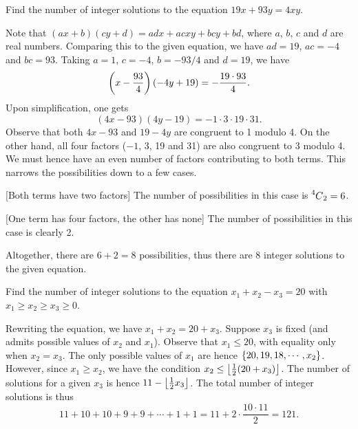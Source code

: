 \begin{question}[8]\label{Q::2022-O-1-17}
    Find the number of integer solutions to the equation $19x + 93y = 4xy$.
\end{question}
\begin{solution*}
    Note that $(ax+b)(cy+d) = adx + acxy + bcy + bd$, where $a$, $b$, $c$ and $d$ are real numbers. Comparing this to the given equation, we have $ad = 19$, $ac = -4$ and $bc = 93$. Taking $a = 1$, $c = -4$, $b = -93/4$ and $d = 19$, we have \[\left( x - \frac{93}{4} \right)(-4y + 19) = -\dfrac{19 \cdot 93}{4}.\] Upon simplification, one gets \[(4x - 93)(4y-19) = -1 \cdot 3 \cdot 19 \cdot 31.\] Observe that both $4x - 93$ and $19 - 4y$ are congruent to 1 modulo 4. On the other hand, all four factors ($-1$, 3, 19 and 31) are also congruent to 3 modulo 4. We must hence have an even number of factors contributing to both terms. This narrows the possibilities down to a few cases.

    [Both terms have two factors] The number of possibilities in this case is $\prescript{4\mkern-0.5mu}{}C_{2} = 6$.

    [One term has four factors, the other has none] The number of possibilities in this case is clearly 2.

    Altogether, there are $6 + 2 = 8$ possibilities, thus there are 8 integer solutions to the given equation.
\end{solution*}

\begin{question}[121]\label{Q::2022-O-1-18}
    Find the number of integer solutions to the equation $x_1 + x_2 - x_3 = 20$ with $x_1 \geq x_2 \geq x_3 \geq 0$.
\end{question}
\begin{solution*}
    Rewriting the equation, we have $x_1 + x_2 = 20 + x_3$. Suppose $x_3$ is fixed (and admits possible values of $x_2$ and $x_1$). Observe that $x_1 \leq 20$, with equality only when $x_2 = x_3$. The only possible values of $x_1$ are hence $\left\lbrace 20, 19, 18, \cdots, x_2 \right\rbrace$. However, since $x_1 \geq x_2$, we have the condition $x_2 \leq \left\lfloor \frac12 (20 + x_3) \right\rfloor$. The number of solutions for a given $x_3$ is hence $11 - \left\lfloor \frac12 x_3 \right\rfloor$. The total number of integer solutions is thus \[11 + 10 + 10 + 9 + 9 + \cdots + 1 + 1 = 11 + 2 \cdot \frac{10 \cdot 11}{2} = 121.\]
\end{solution*}

